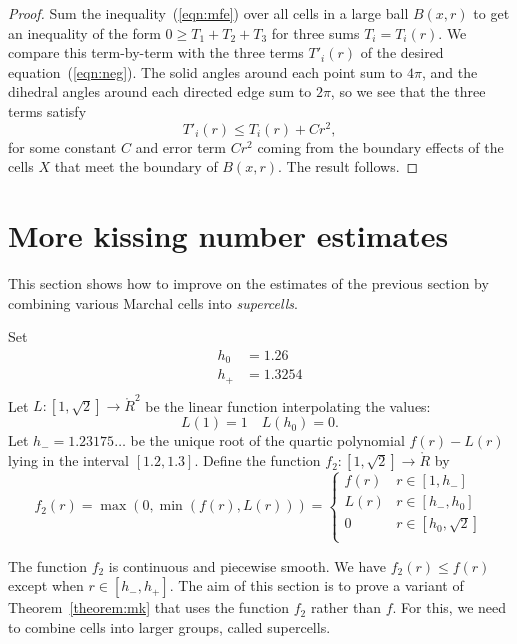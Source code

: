 \begin{proof}
Sum the inequality~(\ref{eqn:mfe}) over all cells in a large ball $B(x,r)$ to get an
inequality of the form $0\ge T_1 + T_2 + T_3$ for three sums $T_i = T_i(r)$.  We compare this term-by-term
with the three terms $T'_i(r)$ of the desired equation~(\ref{eqn:neg}).  The solid angles around each point sum to
$4\pi$, and the dihedral angles around each directed edge sum to $2\pi$, so we see that
the three terms satisfy
$$T'_i(r) \le T_i(r) + C r^2,$$
for some constant $C$ and error term $C r^2$ coming from the boundary effects of the cells $X$ that meet the boundary of $B(x,r)$.  The result follows.
\end{proof}


\section{More kissing number estimates}

This section shows how to improve on the estimates of the previous section
by combining various Marchal cells into {\it supercells}.

\begin{definition}
Set
$$
\begin{array}{lll}
  h_0  &= 1.26\\
  h_+  &= 1.3254\\
\end{array}
$$
Let $L:[1,\sqrt{2}]\to\ring{R}^2$ be the linear function interpolating the
values:
$$
L(1) = 1\quad L(h_0) = 0.
$$
Let $h_- = 1.23175\ldots$ be the unique root of the quartic polynomial
$f(r)-L(r)$ lying in the interval $[1.2,1.3]$.
Define the function $f_2:[1,\sqrt{2}]\to\ring{R}$ by
$$
f_2(r) = \max(0,\min(f(r),L(r))) = 
\begin{cases}
  f(r) & r \in [1,h_-]\\
  L(r) & r \in [h_-,h_0]\\
  0 & r \in [h_0,\sqrt2]\\
\end{cases}
$$
\end{definition}

The function $f_2$ is continuous and piecewise smooth.  We have
$f_2(r)\le f(r)$ except when $r\in [h_-,h_+]$.  The aim of this section is to prove a variant of Theorem~\ref{theorem:mk} that uses the function $f_2$ rather than $f$.  For this, we need to combine cells into larger groups, called supercells.

